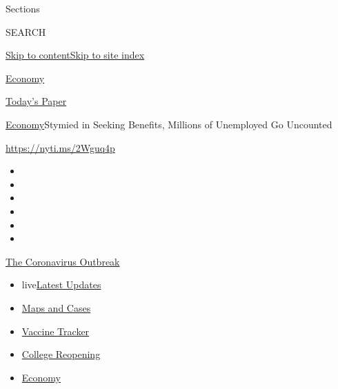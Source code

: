 Sections

SEARCH

\protect\hyperlink{site-content}{Skip to
content}\protect\hyperlink{site-index}{Skip to site index}

\href{https://www.nytimes.com/section/business/economy}{Economy}

\href{https://myaccount.nytimes.com/auth/login?response_type=cookie\&client_id=vi}{}

\href{https://www.nytimes.com/section/todayspaper}{Today's Paper}

\href{/section/business/economy}{Economy}\textbar{}Stymied in Seeking
Benefits, Millions of Unemployed Go Uncounted

\url{https://nyti.ms/2Wguq4p}

\begin{itemize}
\item
\item
\item
\item
\item
\item
\end{itemize}

\href{https://www.nytimes.com/news-event/coronavirus?action=click\&pgtype=Article\&state=default\&region=TOP_BANNER\&context=storylines_menu}{The
Coronavirus Outbreak}

\begin{itemize}
\tightlist
\item
  live\href{https://www.nytimes.com/2020/08/04/world/coronavirus-cases.html?action=click\&pgtype=Article\&state=default\&region=TOP_BANNER\&context=storylines_menu}{Latest
  Updates}
\item
  \href{https://www.nytimes.com/interactive/2020/us/coronavirus-us-cases.html?action=click\&pgtype=Article\&state=default\&region=TOP_BANNER\&context=storylines_menu}{Maps
  and Cases}
\item
  \href{https://www.nytimes.com/interactive/2020/science/coronavirus-vaccine-tracker.html?action=click\&pgtype=Article\&state=default\&region=TOP_BANNER\&context=storylines_menu}{Vaccine
  Tracker}
\item
  \href{https://www.nytimes.com/2020/08/02/us/covid-college-reopening.html?action=click\&pgtype=Article\&state=default\&region=TOP_BANNER\&context=storylines_menu}{College
  Reopening}
\item
  \href{https://www.nytimes.com/live/2020/08/04/business/stock-market-today-coronavirus?action=click\&pgtype=Article\&state=default\&region=TOP_BANNER\&context=storylines_menu}{Economy}
\end{itemize}


